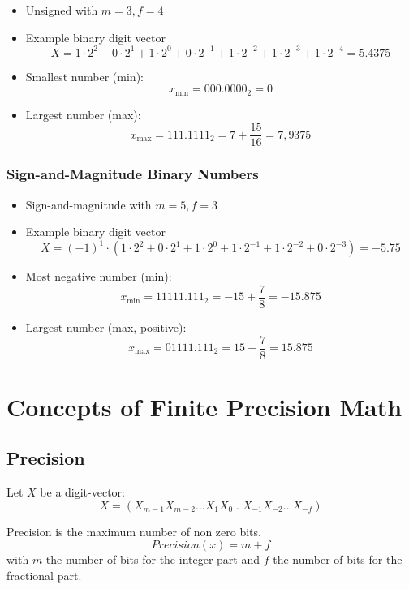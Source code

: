 \documentclass[12pt,openany, tikz,border=10pt]{book}
\begin{document}
    \begin{itemize}
        \item[] Unsigned with \( m = 3, f = 4 \)
        \item[] Example binary digit vector
        \[
            X = 1 \cdot 2^2 + 0 \cdot 2^1 + 1 \cdot 2^0 + 0 \cdot 2^{-1} + 1 \cdot 2^{-2} + 1 \cdot 2^{-3} + 1 \cdot 2^{-4} = 5.4375 \]

        \item[] Smallest number (min):
        \[
        x_{\text{min}} = 000.0000_2 = 0
        \]
        \item[] Largest number (max):
        \[
        x_{\text{max}} = 111.1111_2 = 7 + \frac{15}{16} = 7,9375
        \]
    \end{itemize}
    
    \subsubsection{Sign-and-Magnitude Binary Numbers}
    \begin{itemize}
        \item[] Sign-and-magnitude with \( m = 5, f = 3 \)
        \item[] Example binary digit vector
        \[
            X = (-1)^{1} \cdot (1 \cdot 2^2 + 0 \cdot 2^1 + 1 \cdot 2^0 + 1 \cdot 2^{-1} + 1 \cdot 2^{-2} + 0 \cdot 2^{-3}) = -5.75
        \]
        \item[] Most negative number (min):
        \[
            x_{\text{min}} = 1 1111.111_2 = -15 + \frac{7}{8} = -15.875
        \]
        \item[] Largest number (max, positive):
        \[
            x_{\text{max}} = 0 1111.111_2 = 15 + \frac{7}{8} = 15.875
        \]
    \end{itemize}
      
    \section{Concepts of
    Finite Precision Math}
    \subsection{Precision}
    Let \( X \) be a digit-vector:
    \[ X = (X_{m-1} X_{m-2} \dots X_1 X_0 \; . \;  X_{-1} X_{-2} \dots X_{-f}) \]

    Precision is the maximum number of non zero bits.
    $$Precision(x) = m + f$$ with \(m\) the number of bits for the integer part and \(f\) the number of bits for the fractional part.
\end{document}
